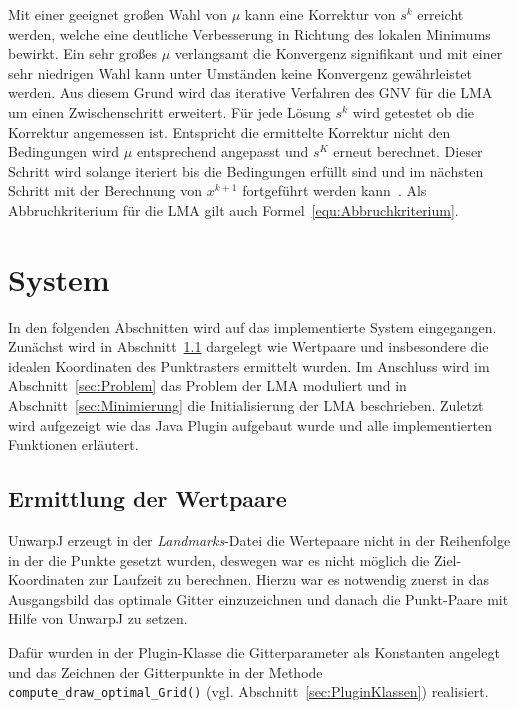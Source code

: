 Mit einer geeignet großen Wahl von $\mu$ kann eine Korrektur von $s^k$ erreicht werden, welche eine deutliche Verbesserung in Richtung des lokalen Minimums bewirkt. Ein sehr großes $\mu$ verlangsamt die Konvergenz signifikant und mit einer sehr niedrigen Wahl kann unter Umständen keine Konvergenz gewährleistet werden. Aus diesem Grund wird das iterative Verfahren des GNV für die LMA um einen Zwischenschritt erweitert. Für jede Lösung $s^k$ wird getestet ob die Korrektur angemessen ist. Entspricht die ermittelte Korrektur nicht den Bedingungen wird $\mu$ entsprechend angepasst und $s^K$ erneut berechnet. Dieser Schritt wird solange iteriert bis die Bedingungen erfüllt sind und im nächsten Schritt mit der Berechnung von $x^{k+1}$ fortgeführt werden kann~\cite{dahmen2008numerik}. Als Abbruchkriterium für die LMA gilt auch Formel~\ref{equ:Abbruchkriterium}.

 

\section{System}
\label{sec:System}

In den folgenden Abschnitten wird auf das implementierte System eingegangen. Zunächst wird in Abschnitt~\ref{sec:Wertpaare} dargelegt wie Wertpaare und insbesondere die idealen Koordinaten des Punktrasters ermittelt wurden. Im Anschluss wird im Abschnitt~\ref{sec:Problem} das Problem der LMA moduliert und in Abschnitt~\ref{sec:Minimierung} die Initialisierung der LMA beschrieben. Zuletzt wird aufgezeigt wie das Java Plugin aufgebaut wurde und alle implementierten Funktionen erläutert.


\subsection{Ermittlung der Wertpaare}
\label{sec:Wertpaare}

UnwarpJ erzeugt in der \textit{Landmarks}-Datei die Wertepaare nicht in der Reihenfolge in der die Punkte gesetzt wurden, deswegen war es nicht möglich die Ziel-Koordinaten zur Laufzeit zu berechnen. Hierzu war es notwendig zuerst in das Ausgangsbild das optimale Gitter einzuzeichnen und danach die Punkt-Paare mit Hilfe von UnwarpJ zu setzen.

Dafür wurden in der Plugin-Klasse die Gitterparameter als Konstanten angelegt und das Zeichnen der Gitterpunkte in der Methode \texttt{compute\_draw\_optimal\_Grid()} (vgl. Abschnitt~\ref{sec:PluginKlassen}) realisiert.

